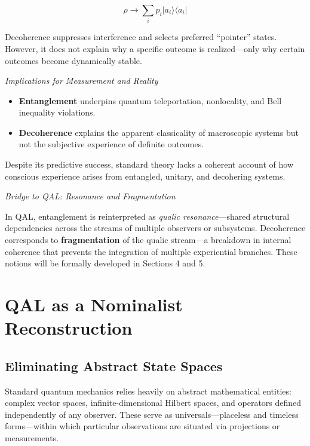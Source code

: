 \documentclass[11pt]{article}
\numberwithin{equation}{section} %
\begin{document}
\begin{equation}
\rho \rightarrow \sum_i p_i |a_i\rangle \langle a_i|
\end{equation}

Decoherence suppresses interference and selects preferred “pointer” states. However, it does not explain why a specific outcome is realized—only why certain outcomes become dynamically stable.

\bigskip

\noindent \textit{Implications for Measurement and Reality}

\begin{itemize}
  \item \textbf{Entanglement} underpins quantum teleportation, nonlocality, and Bell inequality violations.
  \item \textbf{Decoherence} explains the apparent classicality of macroscopic systems but not the subjective experience of definite outcomes.
\end{itemize}

Despite its predictive success, standard theory lacks a coherent account of how conscious experience arises from entangled, unitary, and decohering systems.

\bigskip

\noindent \textit{Bridge to QAL: Resonance and Fragmentation}

In QAL, entanglement is reinterpreted as \textit{qualic resonance}—shared structural dependencies across the streams of multiple observers or subsystems. Decoherence corresponds to \textbf{fragmentation} of the qualic stream—a breakdown in internal coherence that prevents the integration of multiple experiential branches. These notions will be formally developed in Sections 4 and 5.

\section{QAL as a Nominalist Reconstruction}

\subsection{Eliminating Abstract State Spaces}

Standard quantum mechanics relies heavily on abstract mathematical entities: complex vector spaces, infinite-dimensional Hilbert spaces, and operators defined independently of any observer. These serve as universals---placeless and timeless forms---within which particular observations are situated via projections or measurements.
\end{document}
